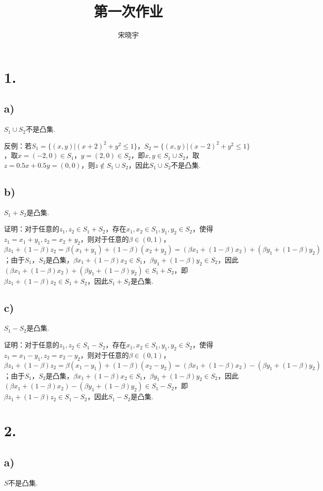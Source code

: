 \documentclass{article}
\title{\heiti 第一次作业}
\author{\kaishu 宋晓宇}
\date{}
\begin{document}
	\maketitle
	\section*{1.}
	\subsection*{a)}
	$S_1\cup S_2$不是凸集.
	
	反例：若$S_1=\{(x,y)|(x+2)^2+y^2\leq 1\}$，$S_2=\{(x,y)|(x-2)^2+y^2\leq 1\}$，取$x=(-2, 0)\in S_1$，$y=(2, 0)\in S_2$，即$x,y\in S_1\cup S_2$，取$z=0.5x+0.5y=(0, 0)$，则$z\notin S_1\cup S_2$，因此$S_1\cup S_2$不是凸集.
	\subsection*{b)}
	$S_1+S_2$是凸集.
	
	证明：对于任意的$z_1,z_2\in S_1+S_2$，存在$x_1,x_2\in S_1, y_1,y_2\in S_2$，使得$z_1=x_1+y_1, z_2=x_2+y_2$，则对于任意的$\beta\in (0,1)$，$\beta z_1+(1-\beta)z_2=\beta(x_1+y_1)+(1-\beta)(x_2+y_2)=(\beta x_1+(1-\beta)x_2)+(\beta y_1+(1-\beta)y_2)$；由于$S_1$，$S_2$是凸集，$\beta x_1+(1-\beta)x_2\in S_1$，$\beta y_1+(1-\beta)y_2\in S_2$，因此$(\beta x_1+(1-\beta)x_2)+(\beta y_1+(1-\beta)y_2)\in S_1+S_2$，即$\beta z_1+(1-\beta)z_2\in S_1+S_2$，因此$S_1+S_2$是凸集.
	
	\subsection*{c)}
	$S_1-S_2$是凸集.
	
	证明：对于任意的$z_1,z_2\in S_1-S_2$，存在$x_1,x_2\in S_1, y_1,y_2\in S_2$，使得$z_1=x_1-y_1, z_2=x_2-y_2$，则对于任意的$\beta\in (0,1)$，$\beta z_1+(1-\beta)z_2=\beta(x_1-y_1)+(1-\beta)(x_2-y_2)=(\beta x_1+(1-\beta)x_2)-(\beta y_1+(1-\beta)y_2)$；由于$S_1$，$S_2$是凸集，$\beta x_1+(1-\beta)x_2\in S_1$，$\beta y_1+(1-\beta)y_2\in S_2$，因此$(\beta x_1+(1-\beta)x_2)-(\beta y_1+(1-\beta)y_2)\in S_1-S_2$，即$\beta z_1+(1-\beta)z_2\in S_1-S_2$，因此$S_1-S_2$是凸集.
	\section*{2.}
	\subsection*{a)}
	$S$不是凸集.
	
\end{document}
